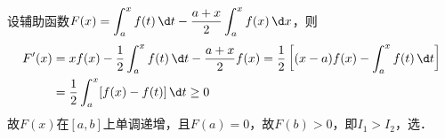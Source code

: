 \documentclass[12pt, a4paper, oneside, UTF8]{ctexbook}
\begin{document}
\begin{solution}
    设辅助函数$F(x)=\displaystyle\int_{a}^{x} f(t)\,\d t-\frac{a+x}{2}\int_a^x f(x)\,\d x$，则
    \begin{align*}
        F'(x)&=xf(x)-\dfrac{1}{2}\int_a^x f(t)\,\d t - \dfrac{a+x}{2}f(x)
    =\dfrac{1}{2}\left[(x-a)f(x) - \displaystyle\int_a^x f(t)\,\d t\right]\\
    &=\dfrac{1}{2}\displaystyle\int_a^x [f(x)-f(t)]\,\d t \ge 0
    \end{align*}
    故$F(x)$在$[a,b]$上单调递增，且$F(a)=0$，故$F(b) > 0$，即$I_1 > I_2$，选．
\end{solution}
\ifx\allfiles\undefined
\end{document}
